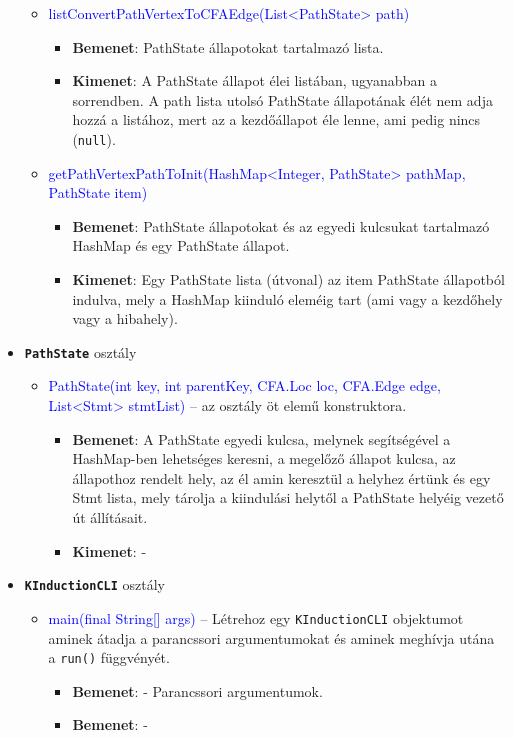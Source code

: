 \begin{itemize}
\begin{itemize}
		\item \textcolor{blue}{listConvertPathVertexToCFAEdge(List<PathState> path)}
		\begin{itemize}
			\item \textbf{Bemenet}: PathState állapotokat tartalmazó lista.
			\item \textbf{Kimenet}: A PathState állapot élei listában, ugyanabban a sorrendben. A path lista utolsó PathState állapotának élét nem adja hozzá a listához, mert az a kezdőállapot éle lenne, ami pedig nincs (\texttt{null}).
		\end{itemize}
	
		\item \textcolor{blue}{getPathVertexPathToInit(HashMap<Integer, PathState> pathMap, PathState item)}
		\begin{itemize}
			\item \textbf{Bemenet}: PathState állapotokat és az egyedi kulcsukat tartalmazó HashMap és egy PathState állapot.
			\item \textbf{Kimenet}: Egy PathState lista (útvonal) az item PathState állapotból indulva, mely a HashMap kiinduló eleméig tart (ami vagy a kezdőhely vagy a hibahely).
		\end{itemize}
	\end{itemize}

	\item \textbf{\texttt{PathState}} osztály
	\begin{itemize}
		\item \textcolor{blue}{PathState(int key, int parentKey, CFA.Loc loc, CFA.Edge edge, List<Stmt> stmtList)} -- az osztály öt elemű konstruktora.
		\begin{itemize}
			\item \textbf{Bemenet}: A PathState egyedi kulcsa, melynek segítségével a HashMap-ben lehetséges keresni, a megelőző állapot kulcsa, az állapothoz rendelt hely, az él amin keresztül a helyhez értünk és egy Stmt lista, mely tárolja a kiindulási helytől a PathState helyéig vezető út állításait. 
			\item \textbf{Kimenet}: -
		\end{itemize}
	\end{itemize}

	\item \textbf{\texttt{KInductionCLI}} osztály
	\begin{itemize}
		\item \textcolor{blue}{main(final String[] args)} -- Létrehoz egy \texttt{KInductionCLI} objektumot aminek átadja a parancssori argumentumokat és aminek meghívja utána a \texttt{run()} függvényét.
		\begin{itemize}
			\item \textbf{Bemenet}: - Parancssori argumentumok.
			\item \textbf{Bemenet}: -
		\end{itemize}
		

\end{itemize}
\end{itemize}

